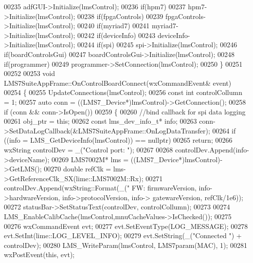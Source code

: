 \begin{DoxyCode}
{{{00235         adfGUI->Initialize(lmsControl);
00236     \textcolor{keywordflow}{if}(hpm7)
00237         hpm7->Initialize(lmsControl);
00238     \textcolor{keywordflow}{if}(fpgaControls)
00239         fpgaControls->Initialize(lmsControl);
00240     \textcolor{keywordflow}{if}(myriad7)
00241         myriad7->Initialize(lmsControl);
00242     \textcolor{keywordflow}{if}(deviceInfo)
00243         deviceInfo->Initialize(lmsControl);
00244     \textcolor{keywordflow}{if}(spi)
00245         spi->Initialize(lmsControl);
00246     \textcolor{keywordflow}{if}(boardControlsGui)
00247         boardControlsGui->Initialize(lmsControl);
00248     \textcolor{keywordflow}{if}(programmer)
00249         programmer->SetConnection(lmsControl);
00250 \}
00251 
00252 
00253 \textcolor{keywordtype}{void} LMS7SuiteAppFrame::OnControlBoardConnect(wxCommandEvent& event)
00254 \{
00255     UpdateConnections(lmsControl);
00256     \textcolor{keyword}{const} \textcolor{keywordtype}{int} controlCollumn = 1;
00257     \textcolor{keyword}{auto} conn = ((LMS7_Device*)lmsControl)->GetConnection();
00258     \textcolor{keywordflow}{if} (conn && conn->IsOpen())
00259     \{
00260         \textcolor{comment}{//bind callback for spi data logging}
00261         obj_ptr = \textcolor{keyword}{this};
00262         \textcolor{keyword}{const} lms_dev_info_t* info;
00263         conn->SetDataLogCallback(&LMS7SuiteAppFrame::OnLogDataTransfer);
00264         \textcolor{keywordflow}{if} ((info = LMS_GetDeviceInfo(lmsControl)) == \textcolor{keyword}{nullptr})
00265                 \textcolor{keywordflow}{return};
00266         wxString controlDev = \_(\textcolor{stringliteral}{"Control port: "});
00267 
00268         controlDev.Append(info->deviceName);
00269         LMS7002M* lms = ((LMS7_Device*)lmsControl)->GetLMS();
00270         \textcolor{keywordtype}{double} refClk = lms->GetReferenceClk_SX(lime::LMS7002M::Rx);
00271         controlDev.Append(wxString::Format(\_(\textcolor{stringliteral}{" FW:%
      firmwareVersion, info->hardwareVersion, info->protocolVersion, info->
      gatewareVersion, refClk/1e6));
00272         statusBar->SetStatusText(controlDev, controlCollumn);
00273 
00274         LMS_EnableCalibCache(lmsControl,mnuCacheValues->IsChecked());
00275 
00276         wxCommandEvent evt;
00277         evt.SetEventType(LOG\_MESSAGE);
00278         evt.SetInt(lime::LOG_LEVEL_INFO);
00279         evt.SetString(\_(\textcolor{stringliteral}{"Connected "}) + controlDev);
00280         LMS_WriteParam(lmsControl, LMS7param(MAC), 1);
00281         wxPostEvent(\textcolor{keyword}{this}, evt);
}}}}
\end{DoxyCode}
